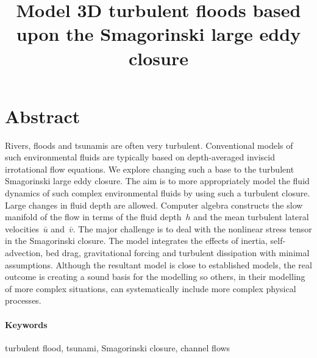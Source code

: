 \documentclass[12pt,a5paper]{article}
\title{Model 3D turbulent floods based upon the Smagorinski large eddy closure}
\date{}
\begin{document}
\maketitle

\section*{Abstract}


Rivers, floods and tsunamis are often very turbulent. Conventional models of such environmental fluids are typically based on depth-averaged inviscid irrotational flow equations. We explore changing such a base to the turbulent Smagorinski large eddy closure. The aim is to more appropriately model the fluid dynamics of such complex environmental fluids by using such a turbulent closure. Large changes in fluid depth are allowed. Computer algebra constructs the slow manifold of the flow in terms of the fluid depth~$h$ and the mean turbulent lateral velocities~$\bar u$ and~$\bar v$. The major challenge is to deal with the nonlinear stress tensor in the Smagorinski closure. The model integrates the effects of inertia, self-advection, bed drag, gravitational forcing and turbulent dissipation with minimal assumptions. Although the resultant model is close to established models, the real outcome is creating a sound basis for the modelling so others, in their modelling of more complex situations, can systematically include more complex physical processes.

\paragraph{Keywords} turbulent flood, tsunami, Smagorinski closure, channel flows
















\end{document}
